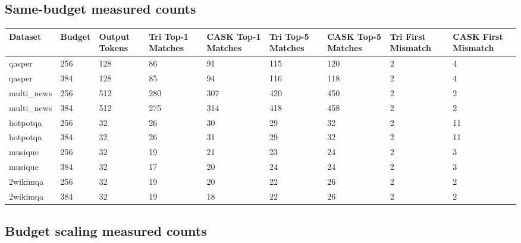 \subsection{Same-budget measured counts}


\begin{table}[H]
\centering
\small
\begin{tabularx}{\textwidth}{YYYYYYYYY}
\toprule
Dataset & Budget & Output Tokens & Tri Top-1 Matches & CASK Top-1 Matches & Tri Top-5 Matches & CASK Top-5 Matches & Tri First Mismatch & CASK First Mismatch \\
\midrule
qasper & 256 & 128 & 86 & 91 & 115 & 120 & 2 & 4 \\
qasper & 384 & 128 & 85 & 94 & 116 & 118 & 2 & 4 \\
multi\_news & 256 & 512 & 280 & 307 & 420 & 450 & 2 & 2 \\
multi\_news & 384 & 512 & 275 & 314 & 418 & 458 & 2 & 2 \\
hotpotqa & 256 & 32 & 26 & 30 & 29 & 32 & 2 & 11 \\
hotpotqa & 384 & 32 & 26 & 31 & 29 & 32 & 2 & 11 \\
musique & 256 & 32 & 19 & 21 & 23 & 24 & 2 & 3 \\
musique & 384 & 32 & 17 & 20 & 24 & 24 & 2 & 3 \\
2wikimqa & 256 & 32 & 19 & 20 & 22 & 26 & 2 & 2 \\
2wikimqa & 384 & 32 & 19 & 18 & 22 & 26 & 2 & 2 \\
\bottomrule
\end{tabularx}
\end{table}


\subsection{Budget scaling measured counts}


